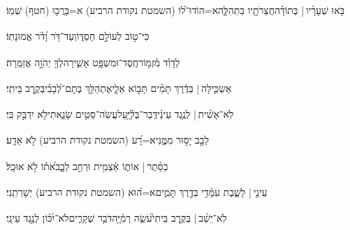 \documentclass[12pt]{article}
\newcommand{\loc}[1]{\textsuperscript{\locf{#1}}}
\begin{document}
{\loc{ ד}~}‏בֹּ֤אוּ שְׁעָרָ֨יו |  בְּתוֹדָ֗ה{\hfill}חֲצֵרֹתָ֥יו בִּתְהִלָּ֑ה\newline\hspace*{.5em}א=הוֹדוּ־ל֝וֹ (השמטת נקודת הרביע) א=בָּרֲכ֥וּ (חטף) שְׁמֽוֹ׃\par

{\loc{ ה}~}‏כִּי־ט֣וֹב  לְעוֹלָ֣ם חַסְדּ֑וֹ{\hfill}וְעַד־דֹּ֥ר וָ֝דֹ֗ר אֱמוּנָתֽוֹ׃\par\pend
\ledpb
\pstart[\subsection*{\textcolor{red}{פרק קא}}]\label{פרק קא}
{\loc{ א}~}‏לְדָוִ֗ד מִ֫זְמ֥וֹר\newline\hspace*{.5em}חֶֽסֶד־וּמִשְׁפָּ֥ט אָשִׁ֑ירָה{\hfill}לְךָ֖ יְהֹוָ֣ה אֲזַמֵּֽרָה׃\par

{\loc{ ב}~}‏אַשְׂכִּ֤ילָה |  בְּדֶ֬רֶךְ תָּמִ֗ים{\hfill} תָּב֣וֹא אֵלָ֑י\newline\hspace*{.5em}אֶתְהַלֵּ֥ךְ בְּתׇם־לְ֝בָבִ֗י{\hfill}בְּקֶ֣רֶב בֵּיתִֽי׃\par

{\loc{ ג}~}‏לֹֽא־אָשִׁ֨ית |  לְנֶ֥גֶד עֵינַ֗י{\hfill}דְּֽבַר־בְּלִ֫יָּ֥עַל\newline\hspace*{.5em}עֲשֹֽׂה־סֵטִ֥ים שָׂנֵ֑אתִי{\hfill}לֹ֖א יִדְבַּ֣ק בִּֽי׃\par

{\loc{ ד}~}‏לֵבָ֣ב  יָס֣וּר מִמֶּ֑נִּי{\hfill}א=רָ֝ע (השמטת נקודת הרביע) לֹ֣א אֵדָֽע׃\par

{\loc{ ה}~}‏ בַסֵּ֨תֶר |  {\hfill}אוֹת֢וֹ אַ֫צְמִ֥ית\newline\hspace*{.5em} וּרְחַ֣ב לֵבָ֑ב{\hfill}אֹ֝ת֗וֹ לֹ֣א אוּכָֽל׃\par

{\loc{ ו}~}‏עֵינַ֤י |  {\hfill}לָשֶׁ֢בֶת עִמָּ֫דִ֥י\newline\hspace*{.5em} בְּדֶ֣רֶךְ תָּמִ֑ים{\hfill}א=ה֝וּא (השמטת נקודת הרביע) יְשָׁרְתֵֽנִי׃\par

{\loc{ ז}~}‏לֹֽא־יֵשֵׁ֨ב |  בְּקֶ֥רֶב בֵּיתִי֮{\hfill}עֹשֵׂ֢ה רְמִ֫יָּ֥ה\newline\hspace*{.5em}דֹּבֵ֥ר שְׁקָרִ֑ים{\hfill}לֹא־יִ֝כּ֗וֹן לְנֶ֣גֶד עֵינָֽי׃\par
\end{document}

